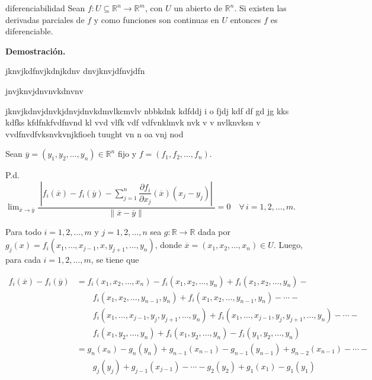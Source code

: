\documentclass[fleqn, 12pt]{article}
\author{Osmar Dominique Santana Reyes}
\date{\today}
\newenvironment{ejercicio}[1]{\begin{ejer}[breakable, pad at break = 5mm]{}{#1}}{\end{ejer}}
\begin{document}
	\begin{ejercicio}{diferenciabilidad}
		Sean $ f: U \subseteq \mathbb{R}^n \to \mathbb{R}^m $, con $ U $ un abierto de $ \mathbb{R}^n $. Si existen las derivadas parciales de $ f $ y como funciones son continuas en $ U $ entonces $ f $ es diferenciable.

		\tcblower

		\textbf{Demostración.}

		jknvjkdfnvjkdnjkdnv
		dnvjknvjdfnvjdfn \medskip

		jnvjknvjdnvnvkdnvnv

		jknvjkdnvjdnvkjdnvjdnvkdmvlkcmvlv nbbkdnk  kdfddj   i o fjdj kdf df  gd jg kks kdfks kfdfnkfvdfnvnd kl vvd vlfk vdf vdfvnklmvk nvk v  v nvlknvksn v vvdfnvdfvksnvkvnjkfioeh tuught vn n  oa vnj nod

		Sean $ \overline{y} = \left( y_1, y_2, \ldots, y_n \right) \in \mathbb{R}^n $ fijo y $ f = \left( f_1, f_2, \ldots, f_n \right) $.

		P.d. $ \displaystyle \lim_{\overline{x} \to \overline{y}} \dfrac{ \phantom{|} \left\lvert f_i(\overline{x}) - f_i(\overline{y}) - \displaystyle \sum_{j=1}^{n} \dfrac{ \partial f_i }{ \partial x_j } (\overline{x}) \left( x_j - y_j \right) \right\rvert \phantom{|} }{ \left\lVert \overline{x} - \overline{y} \right\rVert } = 0 \quad \forall \, i = 1, 2, \ldots, m $.

		Para todo $ i = 1, 2, \ldots, m $ y $ j = 1, 2, \ldots, n $ sea $ g : \mathbb{R} \to \mathbb{R} $ dada por $ g_j(x) = f_i\left( x_1, \ldots, x_{j-1}, x, y_{j+1}, \ldots, y_n \right) $, donde $ \overline{x} = \left( x_1, x_2, \ldots, x_n \right) \in U $. Luego, para cada $ i = 1, 2, \ldots, m $, se tiene que

		\begin{equation*}
			\begin{split}
				f_i(\overline{x}) - f_i(\overline{y}) &= f_i\left( x_1, x_2, \ldots, x_n \right) - f_i\left( x_1, x_2, \ldots, y_n \right) + f_i\left( x_1, x_2, \ldots, y_n \right) - \\
				& \qquad f_i\left( x_1, x_2, \ldots, y_{n-1}, y_n \right) + f_i\left( x_1, x_2, \ldots, y_{n-1}, y_n \right) - \cdots - \\
				& \qquad f_i\left( x_1, \ldots, x_{j-1}, y_j, y_{j+1}, \ldots, y_n \right) + f_i\left( x_1, \ldots, x_{j-1}, y_j, y_{j+1}, \ldots, y_n \right) - \cdots - \\
				& \qquad f_i\left( x_1, y_2, \ldots, y_n \right) + f_i\left( x_1, y_2, \ldots, y_n \right) - f_i\left( y_1, y_2, \ldots, y_n \right) \\
				&= g_n(x_n) - g_n(y_n) + g_{n-1}(x_{n-1}) - g_{n-1}(y_{n-1}) + g_{n-2}(x_{n-1}) - \cdots - \\
				& \qquad g_j(y_j) + g_{j-1}(x_{j-1}) - \cdots - g_2(y_2) + g_1(x_1) - g_1(y_1)
			\end{split}
		\end{equation*}


\end{ejercicio}
\end{document}
